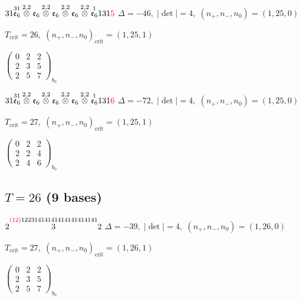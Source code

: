 \documentclass[10pt]{article}
\begin{document}
$31\overset{31}{\mathfrak{e}_6}\overset{2,2}{\otimes}\mathfrak{e}_6\overset{2,2}{\otimes}\mathfrak{e}_6\overset{2,2}{\otimes}\mathfrak{e}_6\overset{2,2}{\otimes}\overset{1}{\mathfrak{e}_6}131\textcolor{red}{5}$ \quad $\Delta=-46,\; |\det|=4,\; (n_+,n_-,n_0)=(1,25,0)$

\hspace{1em}$T_{\text{crit}}=26,\; (n_+,n_-,n_0)_{\text{crit}}=(1,25,1)$

\hspace{2em}$\left(\begin{smallmatrix}0 & 2 & 2 \\ 2 & 3 & 5 \\ 2 & 5 & 7\end{smallmatrix}\right)_{\!b_0}$

$31\overset{31}{\mathfrak{e}_6}\overset{2,2}{\otimes}\mathfrak{e}_6\overset{2,2}{\otimes}\mathfrak{e}_6\overset{2,2}{\otimes}\mathfrak{e}_6\overset{2,2}{\otimes}\overset{1}{\mathfrak{e}_6}131\textcolor{red}{6}$ \quad $\Delta=-72,\; |\det|=4,\; (n_+,n_-,n_0)=(1,25,0)$

\hspace{1em}$T_{\text{crit}}=27,\; (n_+,n_-,n_0)_{\text{crit}}=(1,25,1)$

\hspace{2em}$\left(\begin{smallmatrix}0 & 2 & 2 \\ 2 & 2 & 4 \\ 2 & 4 & 6\end{smallmatrix}\right)_{\!b_0}$


\subsection*{$T = 26$ \quad (9 bases)}
\smallskip

$2\overset{\textcolor{red}{(12)}12231414141414141414141}{3}2$ \quad $\Delta=-39,\; |\det|=4,\; (n_+,n_-,n_0)=(1,26,0)$

\hspace{1em}$T_{\text{crit}}=27,\; (n_+,n_-,n_0)_{\text{crit}}=(1,26,1)$

\hspace{2em}$\left(\begin{smallmatrix}0 & 2 & 2 \\ 2 & 3 & 5 \\ 2 & 5 & 7\end{smallmatrix}\right)_{\!b_0}$
\end{document}
